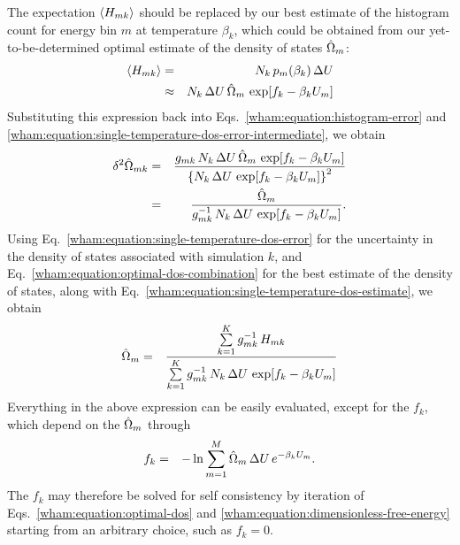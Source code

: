 The expectation $\langle H_{mk} \rangle$ should be replaced by our best estimate of the histogram count for energy bin $m$ at temperature $\beta_k$, which could be obtained from our yet-to-be-determined optimal estimate of the density of states $\hat{\Omega}_m$:
\begin{eqnarray}
\langle H_{mk} \rangle &=& N_k \, p_m(\beta_k) \, \Delta U \nonumber \\ 
&\approx& N_k \, \Delta U \, \hat{\Omega}_m \, \exp[f_k -\beta_k U_m] \label{wham:equation:optimal-histogram-estimate}
\end{eqnarray}
Substituting this expression back into Eqs.\ \ref{wham:equation:histogram-error} and \ref{wham:equation:single-temperature-dos-error-intermediate}, we obtain
\begin{eqnarray}  
\delta^2 \hat{\Omega}_{mk} &=& \frac{g_{mk} \, N_k \, \Delta U \, \hat{\Omega}_m \, \exp[f_k -\beta_k U_m]}{\left\{ N_k \, \Delta U \, \exp[f_k - \beta_k U_m] \right\}^2} \nonumber \\
&=& \frac{\hat{\Omega}_m}{g_{mk}^{-1} \, N_k \, \Delta U \, \exp[f_k - \beta_k U_m]} . \label{wham:equation:single-temperature-dos-error}
\end{eqnarray}
Using Eq.\ \ref{wham:equation:single-temperature-dos-error} for the uncertainty in the density of states associated with simulation $k$, and Eq.\ \ref{wham:equation:optimal-dos-combination} for the best estimate of the density of states, along with Eq.\ \ref{wham:equation:single-temperature-dos-estimate}, we obtain
\begin{eqnarray} 
\hat{\Omega}_m &=& \frac{\sum\limits_{k=1}^K g_{mk}^{-1} \, H_{mk}}{\sum\limits_{k=1}^K g_{mk}^{-1} \, N_k \, \Delta U \, \exp[f_k - \beta_k U_m]} \label{wham:equation:optimal-dos}
\end{eqnarray}
Everything in the above expression can be easily evaluated, except for the $f_k$, which depend on the $\hat{\Omega}_m$ through
\begin{eqnarray}
f_k &=& - \ln \sum_{m=1}^M \hat{\Omega}_m \, \Delta U \, e^{-\beta_k U_m} . \label{wham:equation:dimensionless-free-energy}
\end{eqnarray}
The $f_k$ may therefore be solved for self consistency by iteration of Eqs.\ \ref{wham:equation:optimal-dos} and \ref{wham:equation:dimensionless-free-energy} starting from an arbitrary choice, such as $f_k = 0$.

